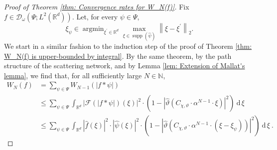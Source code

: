\documentclass[11pt]{amsart}
\newcommand{\R}{{\mathbb{R}}}
\newcommand{\N}{\mathbb{N}}
\newcommand{\dxi}{\:\mathrm{d}\,\xi\:}
\newcommand{\abs}[1]{\ensuremath{\left|\text{}#1\text{}\right|}}
\newcommand{\norm}[1]{\ensuremath{\left\lVert\text{}#1\text{}\right\rVert}}
\DeclareMathOperator{\supp}{supp}
\DeclareMathOperator*{\argmin}{argmin}
\newenvironment{proof sketch} {\textit{Proof sketch.}}{}
\begin{document}
  \begin{proof}[Proof of Theorem \ref{thm: Convergence rates for W_N(f)}]
    Fix $f \in \mathcal{D}_\omega(\Psi;L^2(\R^d))$. Let, for every $\psi \in \Psi$, 
    \[\xi_\psi \in \argmin_{\xi^\prime \in \R^d}\max_{\xi \in \supp(\widehat{\psi})} \norm{\xi-\xi^\prime}_2.\] 
    We start in a similar fashion to the induction step of the proof of Theorem \ref{thm: W_N(f) is upper-bounded by integral}. By the same theorem, by the path structure of the scattering network, and by Lemma \ref{lem: Extension of Mallat's lemma}, we find that, for all sufficiently large $N \in \N$,
    \begin{align}\label{eq: (9)}
      W_{N}(f)&=\sum_{\psi \in \Psi} W_{N-1}(|f*\psi|) \nonumber\\
      &\leq \sum_{\psi \in \Psi} \int_{\R^d} \abs{\mathcal{F}(|f*\psi|)(\xi)}^2 \cdot \left(1-\abs{\widehat{\vartheta}\left(C_{\chi,\vartheta}\cdot \alpha^{N-1}\cdot \xi\right)}^2\right) \dxi \nonumber\\
      &\leq \sum_{\psi \in \Psi} \int_{\R^d} |\widehat{f}(\xi)|^2 \cdot |\widehat{\psi}(\xi)|^2 \cdot \left(1-\abs{\widehat{\vartheta}\left(C_{\chi,\vartheta}\cdot \alpha^{N-1}\cdot (\xi-\xi_\psi)\right)}^2\right) \dxi.
    \end{align}
    

\end{proof}
\end{document}
